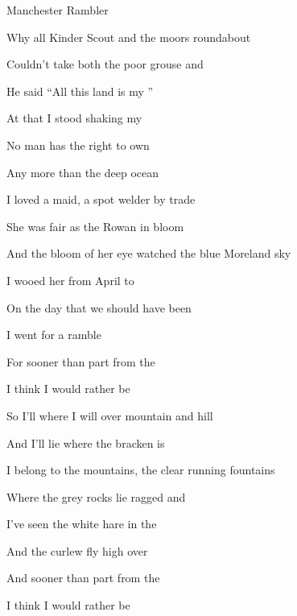 \begin{SBSong}{Manchester Rambler}
\begin{SBVerse}
	Why all Kinder Scout and the moors roundabout
	
	Couldn't take both the poor grouse and 
	
	He said ``All this land is my ''
	
	At that I stood shaking my 
	
	No man has the right to own 
	
	Any more than the deep ocean 
  \end{SBVerse}
  \begin{SBVerse}
	I  loved a maid, a spot welder by trade
	
	She was fair as the Rowan in bloom
	
	And the bloom of her eye watched the blue Moreland sky
	
	I wooed her from April to 
	
	On the day that we should have been 
	
	I went for a ramble 
	
	For sooner than part from the 
	
	I think I would rather be  
  \end{SBVerse}
  \begin{SBVerse}
	So I'll  where I will over mountain and hill
	
	And I'll lie where the bracken is 
	
	I belong to the mountains, the clear running fountains
	
	Where the grey rocks lie ragged and 
	
	I've seen the white hare in the 
	
	And the curlew fly high over
	
	And sooner than part from the  
	
	I think I would rather be 
  \end{SBVerse}
 \end{SBSong}